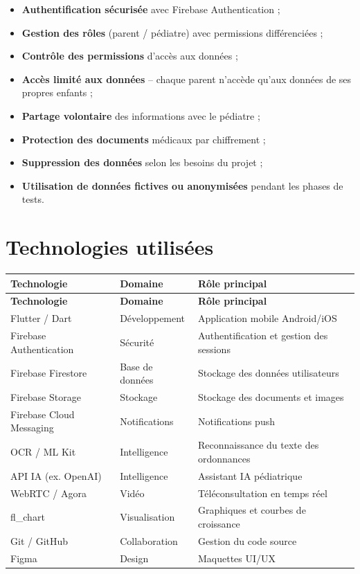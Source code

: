 \documentclass[11pt,a4paper]{article}
\newcommand{\headrow}{\rowcolor{navy}}
\newcommand{\tblhead}[1]{\color{white}\textbf{#1}}
\begin{document}
\begin{itemize}
  \item \textbf{Authentification sécurisée} avec Firebase Authentication ;
  \item \textbf{Gestion des rôles} (parent / pédiatre) avec permissions différenciées ;
  \item \textbf{Contrôle des permissions} d'accès aux données ;
  \item \textbf{Accès limité aux données} -- chaque parent n'accède qu'aux données de ses propres enfants ;
  \item \textbf{Partage volontaire} des informations avec le pédiatre ;
  \item \textbf{Protection des documents} médicaux par chiffrement ;
  \item \textbf{Suppression des données} selon les besoins du projet ;
  \item \textbf{Utilisation de données fictives ou anonymisées} pendant les phases de tests.
\end{itemize}

\section{Technologies utilisées}

\renewcommand{\arraystretch}{1.4}
\begin{longtable}{|p{5cm}|p{3.5cm}|p{5cm}|}
\hline
\headrow \tblhead{Technologie} & \tblhead{Domaine} & \tblhead{Rôle principal} \\
\hline
\endfirsthead
\hline
\headrow \tblhead{Technologie} & \tblhead{Domaine} & \tblhead{Rôle principal} \\
\hline
\endhead
Flutter / Dart & Développement & Application mobile Android/iOS \\
\hline
\rowcolor{rowgrey}
Firebase Authentication & Sécurité & Authentification et gestion des sessions \\
\hline
Firebase Firestore & Base de données & Stockage des données utilisateurs \\
\hline
\rowcolor{rowgrey}
Firebase Storage & Stockage & Stockage des documents et images \\
\hline
Firebase Cloud Messaging & Notifications & Notifications push \\
\hline
\rowcolor{rowgrey}
OCR / ML Kit & Intelligence & Reconnaissance du texte des ordonnances \\
\hline
API IA (ex. OpenAI) & Intelligence & Assistant IA pédiatrique \\
\hline
\rowcolor{rowgrey}
WebRTC / Agora & Vidéo & Téléconsultation en temps réel \\
\hline
fl\_chart & Visualisation & Graphiques et courbes de croissance \\
\hline
\rowcolor{rowgrey}
Git / GitHub & Collaboration & Gestion du code source \\
\hline
Figma & Design & Maquettes UI/UX \\
\hline
\end{longtable}
\end{document}
